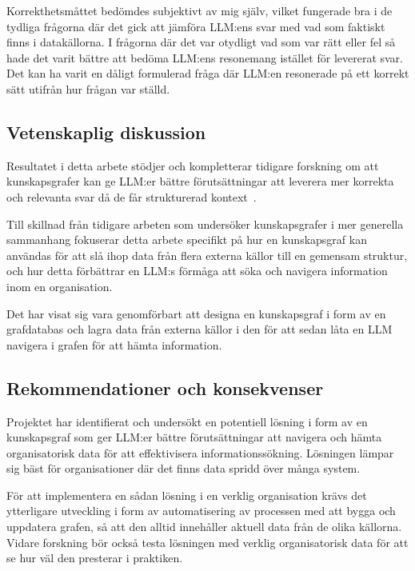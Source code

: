 Korrekthetsmåttet bedömdes subjektivt av mig själv, vilket fungerade bra i de tydliga frågorna där det gick att jämföra LLM:ens svar med vad som faktiskt finns i datakällorna.
I frågorna där det var otydligt vad som var rätt eller fel så hade det varit bättre att bedöma LLM:ens resonemang istället för levererat svar.
Det kan ha varit en dåligt formulerad fråga där LLM:en resonerade på ett korrekt sätt utifrån hur frågan var ställd.


\subsection{Vetenskaplig diskussion}\label{subsec:scientific_discussion}


Resultatet i detta arbete stödjer och kompletterar tidigare forskning om att kunskapsgrafer kan ge LLM:er bättre förutsättningar att leverera mer korrekta och relevanta svar då de får strukturerad kontext~\cite{relWork}.

Till skillnad från tidigare arbeten som undersöker kunskapsgrafer i mer
  generella sammanhang fokuserar detta arbete specifikt på hur en kunskapsgraf
  kan användas för att slå ihop data från flera externa källor till en gemensam
  struktur, och hur detta förbättrar en LLM:s förmåga att söka och navigera
  information inom en organisation.

Det har visat sig vara genomförbart att designa en kunskapsgraf i form av en grafdatabas och lagra data från externa källor i den för att sedan låta en LLM navigera i grafen för att hämta information.

\subsection{Rekommendationer och konsekvenser}\label{subsec:recommendation} 

Projektet har identifierat och undersökt en potentiell lösning i form av en kunskapsgraf som ger LLM:er bättre förutsättningar att navigera och hämta organisatorisk data för att effektivisera informationssökning.
Lösningen lämpar sig bäst för organisationer där det finns data spridd över många system.

För att implementera en sådan lösning i en verklig organisation krävs det ytterligare utveckling i form av automatisering av processen med att bygga och uppdatera grafen, så att den alltid innehåller aktuell data från de olika källorna.
Vidare forskning bör också testa lösningen med verklig organisatorisk data för att se hur väl den presterar i praktiken.


